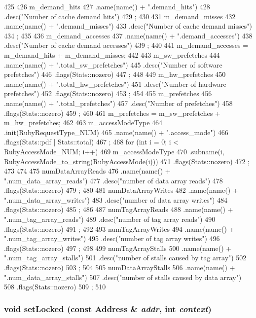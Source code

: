 \begin{DoxyCode}
425 {
426     m_demand_hits
427         .name(name() + ".demand_hits")
428         .desc("Number of cache demand hits")
429         ;
430 
431     m_demand_misses
432         .name(name() + ".demand_misses")
433         .desc("Number of cache demand misses")
434         ;
435 
436     m_demand_accesses
437         .name(name() + ".demand_accesses")
438         .desc("Number of cache demand accesses")
439         ;
440 
441     m_demand_accesses = m_demand_hits + m_demand_misses;
442 
443     m_sw_prefetches
444         .name(name() + ".total_sw_prefetches")
445         .desc("Number of software prefetches")
446         .flags(Stats::nozero)
447         ;
448 
449     m_hw_prefetches
450         .name(name() + ".total_hw_prefetches")
451         .desc("Number of hardware prefetches")
452         .flags(Stats::nozero)
453         ;
454 
455     m_prefetches
456         .name(name() + ".total_prefetches")
457         .desc("Number of prefetches")
458         .flags(Stats::nozero)
459         ;
460 
461     m_prefetches = m_sw_prefetches + m_hw_prefetches;
462 
463     m_accessModeType
464         .init(RubyRequestType_NUM)
465         .name(name() + ".access_mode")
466         .flags(Stats::pdf | Stats::total)
467         ;
468     for (int i = 0; i < RubyAccessMode_NUM; i++) {
469         m_accessModeType
470             .subname(i, RubyAccessMode_to_string(RubyAccessMode(i)))
471             .flags(Stats::nozero)
472             ;
473     }
474 
475     numDataArrayReads
476         .name(name() + ".num_data_array_reads")
477         .desc("number of data array reads")
478         .flags(Stats::nozero)
479         ;
480 
481     numDataArrayWrites
482         .name(name() + ".num_data_array_writes")
483         .desc("number of data array writes")
484         .flags(Stats::nozero)
485         ;
486 
487     numTagArrayReads
488         .name(name() + ".num_tag_array_reads")
489         .desc("number of tag array reads")
490         .flags(Stats::nozero)
491         ;
492 
493     numTagArrayWrites
494         .name(name() + ".num_tag_array_writes")
495         .desc("number of tag array writes")
496         .flags(Stats::nozero)
497         ;
498 
499     numTagArrayStalls
500         .name(name() + ".num_tag_array_stalls")
501         .desc("number of stalls caused by tag array")
502         .flags(Stats::nozero)
503         ;
504 
505     numDataArrayStalls
506         .name(name() + ".num_data_array_stalls")
507         .desc("number of stalls caused by data array")
508         .flags(Stats::nozero)
509         ;
510 }
\end{DoxyCode}
\hypertarget{classCacheMemory_a046beba265922d99b46eb407d30fa14a}{
\subsubsection[{setLocked}]{\setlength{\rightskip}{0pt plus 5cm}void setLocked (const {\bf Address} \& {\em addr}, \/  int {\em context})}}
\label{classCacheMemory_a046beba265922d99b46eb407d30fa14a}



